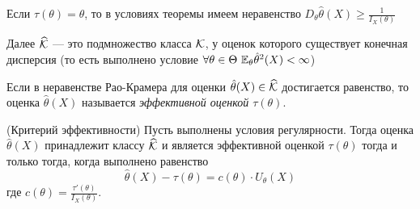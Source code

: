 \begin{corollary}
	Если $\tau(\theta) = \theta$, то в условиях теоремы имеем неравенство $D_\theta \hat{\theta}(X) \ge \frac{1}{I_X(\theta)}$
\end{corollary}

\begin{anote}
	Далее $\widehat{\mathcal{K}}$ --- это подмножество класса $\mathcal{K}$, у оценок которого существует конечная дисперсия (то есть выполнено условие $\forall \theta \in \Theta\ \mathbb{E}_\theta \hat{\theta}^2(X) < \infty$)
\end{anote}

\begin{definition}
	Если в неравенстве Рао-Крамера для оценки $\hat{\theta}(X) \in \widehat{\mathcal{K}}$ достигается равенство, то оценка $\hat{\theta}(X)$ называется \textit{эффективной оценкой $\tau(\theta)$}.
\end{definition}

\begin{theorem} (Критерий эффективности)
	Пусть выполнены условия регулярности. Тогда оценка $\hat{\theta}(X)$ принадлежит классу $\widehat{\mathcal{K}}$ и является эффективной оценкой $\tau(\theta)$ тогда и только тогда, когда выполнено равенство
	\[
		\hat{\theta}(X) - \tau(\theta) = c(\theta) \cdot U_\theta(X)
	\]
	где $c(\theta) = \frac{\tau'(\theta)}{I_X(\theta)}$.
\end{theorem}

